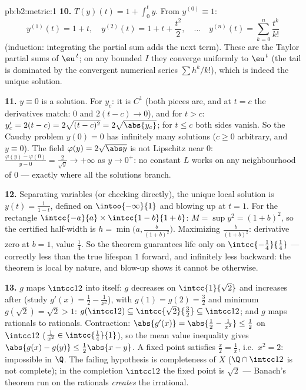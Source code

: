 \begin{solution}{pb:b2:metric:1}
\textbf{10.} $T(y)(t) = 1 + \int_0^t y$. From $y^{(0)} \equiv
1$:
\[
y^{(1)}(t) = 1 + t,\quad
y^{(2)}(t) = 1 + t + \frac{t^2}2,\quad\dots\quad
y^{(n)}(t) = \sum_{k=0}^{n}\frac{t^k}{k!}
\]
(induction: integrating the partial sum adds the next term).
These are the Taylor partial sums of $\eu^{\,t}$; on any bounded
$I$ they converge uniformly to $\eu^{\,t}$ (the tail is
dominated by the convergent numerical series $\sum h^k/k!$),
which is indeed the unique solution.

\textbf{11.} $y \equiv 0$ is a solution. For $y_c$: it is $C^1$
(both pieces are, and at $t = c$ the derivatives match: $0$ and
$2(t - c) \to 0$), and for $t > c$: $y_c' = 2(t - c) =
2\sqrt{(t-c)^2} = 2\sqrt{\abs{y_c}}$; for $t \leq c$ both sides
vanish. So the Cauchy problem $y(0) = 0$ has infinitely many
solutions ($c \geq 0$ arbitrary, and $y \equiv 0$). The field
$\varphi(y) = 2\sqrt{\abs y}$ is not Lipschitz near $0$:
$\frac{\varphi(y) - \varphi(0)}{y - 0} = \frac{2}{\sqrt y} \to
+\infty$ as $y \to 0^+$: no constant $L$ works on any
neighbourhood of $0$ --- exactly where all the solutions
branch.

\textbf{12.} Separating variables (or checking directly), the
unique local solution is $y(t) = \frac1{1 - t}$, defined on
$\intoo{-\infty}{1}$ and blowing up at $t = 1$. For the
rectangle $\intcc{-a}{a} \times \intcc{1 - b}{1 + b}$: $M =
\sup y^2 = (1 + b)^2$, so the certified half-width is $h =
\min\bigl(a, \frac{b}{(1+b)^2}\bigr)$. Maximizing
$\frac{b}{(1+b)^2}$: derivative zero at $b = 1$, value
$\frac14$. So the theorem guarantees life only on
$\intcc{-\frac14}{\frac14}$ --- correctly less than the true
lifespan $1$ forward, and infinitely less backward: the theorem
is local by nature, and blow-up shows it cannot be otherwise.

\textbf{13.} $g$ maps $\intcc12$ into itself: $g$ decreases on
$\intcc{1}{\sqrt2}$ and increases after (study $g'(x) = \frac12
- \frac1{x^2}$), with $g(1) = g(2) = \frac32$ and minimum
$g(\sqrt2) = \sqrt2 > 1$: $g(\intcc12) \subseteq
\intcc{\sqrt2}{\frac32} \subseteq \intcc12$; and $g$ maps
rationals to rationals. Contraction: $\abs{g'(x)} = \abs{\frac12
- \frac1{x^2}} \leq \frac12$ on $\intcc12$ ($\frac1{x^2} \in
\intcc{\frac14}{1}$), so the mean value inequality gives
$\abs{g(x) - g(y)} \leq \frac12\abs{x - y}$. A fixed point
satisfies $\frac x2 = \frac1x$, i.e.\ $x^2 = 2$: impossible in
$\Q$. The failing hypothesis is completeness of $X$ ($\Q \cap
\intcc12$ is not complete); in the completion $\intcc12$ the
fixed point is $\sqrt2$ --- Banach's theorem run on the
rationals \emph{creates} the irrational.


\end{solution}
